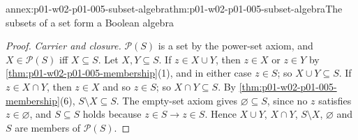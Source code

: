 \begin{annexitem}{annex:p01-w02-p01-005-subset-algebra}{thm:p01-w02-p01-005-subset-algebra}{The subsets of a set form a Boolean algebra}
\begin{proof}
\emph{Carrier and closure.} \(\mathcal P(S)\) is a set by the power-set axiom,
and \(X\in\mathcal P(S)\) iff \(X\subseteq S\). Let \(X,Y\subseteq S\). If
\(z\in X\cup Y\), then \(z\in X\) or \(z\in Y\) by
\cref{thm:p01-w02-p01-005-membership}(1), and in either case \(z\in S\); so
\(X\cup Y\subseteq S\). If \(z\in X\cap Y\), then \(z\in X\) and so
\(z\in S\); so \(X\cap Y\subseteq S\). By
\cref{thm:p01-w02-p01-005-membership}(6), \(S\setminus X\subseteq S\).
The empty-set axiom gives \(\varnothing\subseteq S\), since no \(z\) satisfies
\(z\in\varnothing\), and \(S\subseteq S\) holds because \(z\in S\to z\in S\).
Hence \(X\cup Y\), \(X\cap Y\), \(S\setminus X\), \(\varnothing\) and \(S\) are
members of \(\mathcal P(S)\).


\end{proof}
\end{annexitem}
